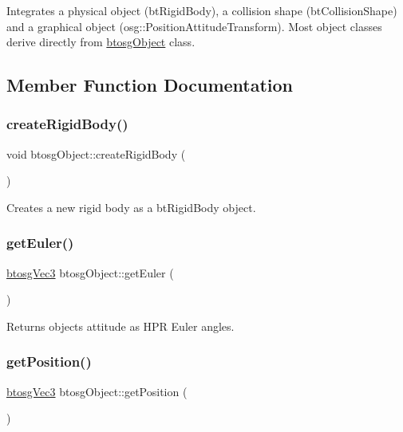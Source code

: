 Integrates a physical object (bt\+Rigid\+Body), a collision shape (bt\+Collision\+Shape) and a graphical object (osg\+::\+Position\+Attitude\+Transform). Most object classes derive directly from \hyperlink{classbtosgObject}{btosg\+Object} class. 

\subsection{Member Function Documentation}
\mbox{\label{classbtosgObject_a029dbe9134fa94e7355799f67fb2cd6d}} 
\subsubsection{\texorpdfstring{create\+Rigid\+Body()}{createRigidBody()}}
{\footnotesize\ttfamily void btosg\+Object\+::create\+Rigid\+Body (\begin{DoxyParamCaption}{ }\end{DoxyParamCaption})\hspace{0.3cm}{\ttfamily [inline]}}

Creates a new rigid body as a bt\+Rigid\+Body object. \mbox{\label{classbtosgObject_a2019ec63bde02b72600450c7c985e77a}} 
\subsubsection{\texorpdfstring{get\+Euler()}{getEuler()}}
{\footnotesize\ttfamily \hyperlink{classbtosgVec3}{btosg\+Vec3} btosg\+Object\+::get\+Euler (\begin{DoxyParamCaption}{ }\end{DoxyParamCaption})\hspace{0.3cm}{\ttfamily [inline]}}

Returns object\textquotesingle{}s attitude as H\+PR Euler angles. \mbox{\label{classbtosgObject_a3dadd5da8f2a312e44a039446b93d4cd}} 
\subsubsection{\texorpdfstring{get\+Position()}{getPosition()}}
{\footnotesize\ttfamily \hyperlink{classbtosgVec3}{btosg\+Vec3} btosg\+Object\+::get\+Position (\begin{DoxyParamCaption}{ }\end{DoxyParamCaption})\hspace{0.3cm}{\ttfamily [inline]}}

